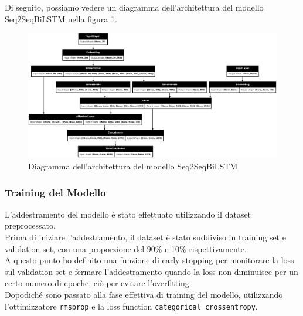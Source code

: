 \documentclass[a4paper, 12pt]{article}
\begin{document}
Di seguito, possiamo vedere un diagramma dell'architettura del modello Seq2SeqBiLSTM nella figura \ref{fig:seq2seqbilstm_model_architecture}.

\begin{figure}[H]
    \centering
    \includegraphics[width=1\textwidth]{media/Seq2SeqBiLSTM_image.png}
    \caption{Diagramma dell'architettura del modello Seq2SeqBiLSTM}
    \label{fig:seq2seqbilstm_model_architecture}
\end{figure}


\subsubsection{Training del Modello}
L'addestramento del modello è stato effettuato utilizzando il dataset preprocessato.\\
Prima di iniziare l'addestramento, il dataset è stato suddiviso in training set e validation set, con una proporzione del 90\% e 10\% rispettivamente.\\
A questo punto ho definito una funzione di early stopping per monitorare la loss sul validation set e fermare l'addestramento quando la loss non diminuisce per un certo numero di epoche, ciò per evitare l'overfitting.\\
Dopodiché sono passato alla fase effettiva di training del modello, utilizzando l'ottimizzatore \texttt{rmsprop} e la loss function \texttt{categorical crossentropy}.\\
\end{document}

